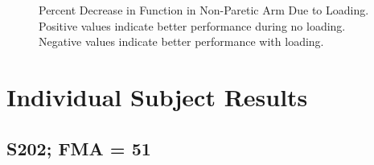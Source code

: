 \documentclass{article}
\begin{document}
\begin{figure}[!ht]
     \centering
     \hfill
	\caption{Percent Decrease in Function in Non-Paretic Arm Due to Loading. Positive values indicate better performance during no loading. Negative values indicate better performance with loading.}
\end{figure}

\clearpage
\section{Individual Subject Results}

\subsection{S202; FMA = 51}
\end{document}
